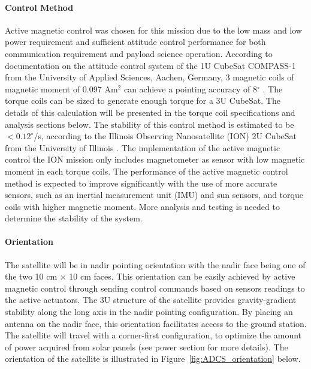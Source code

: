 \documentclass[12pt]{article}
\begin{document}
				\paragraph{Control Method}
				Active magnetic control was chosen for this mission due to the low mass and low power requirement and sufficient attitude control performance for both communication requirement and payload science operation. According to documentation on the attitude control system of the 1U CubeSat COMPASS-1 from the University of Applied Sciences, Aachen, Germany, 3 magnetic coils of magnetic moment of  0.097 Am$^2$ can achieve a pointing accuracy of 8$^\circ$ \cite{adcs_compass}. The torque coils can be sized to generate enough torque for a 3U CubeSat. The details of this calculation will be presented in the torque coil specifications and analysis sections below. The stability of this control method is estimated to be $< 0.12^\circ$/s, according to the Illinois Observing Nanosatellite (ION) 2U CubeSat from the University of Illinois \cite{adcs_ion}. The implementation of the active magnetic control the ION mission only includes magnetometer as sensor with low magnetic moment in each torque coils. The performance of the active magnetic control method is expected to improve significantly with the use of more accurate sensors, such as an inertial measurement unit (IMU) and sun sensors, and torque coils with higher magnetic moment. More analysis and testing is needed to determine the stability of the system. 

				\paragraph{Orientation}
				The satellite will be in nadir pointing orientation with the nadir face being one of the two 10 cm $\times$ 10 cm faces. This orientation can be easily achieved by active magnetic control through sending control commands based on sensors readings to the active actuators. The 3U structure of the satellite provides gravity-gradient stability along the long axis in the nadir pointing configuration. By placing an antenna on the nadir face, this orientation facilitates access to the ground station. The satellite will travel with a corner-first configuration, to optimize the amount of power acquired from solar panels (see power section for more details). The orientation of the satellite is illustrated in Figure~\ref{fig:ADCS_orientation} below. 
			
\end{document}
